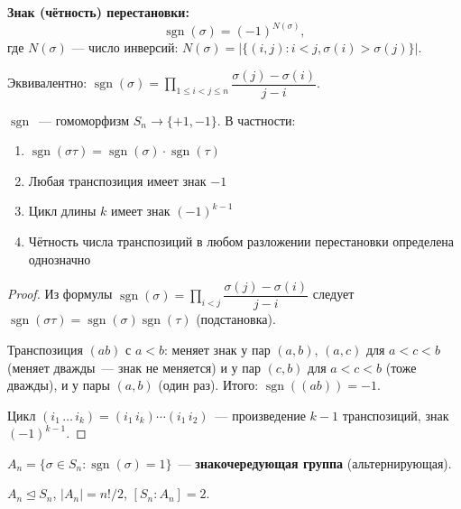 \documentclass[12pt]{article}
\begin{document}
	\begin{definition}
		\textbf{Знак (чётность) перестановки:}
		\[\operatorname{sgn}(\sigma) = (-1)^{N(\sigma)},\]
		где $N(\sigma)$ — число инверсий: $N(\sigma) = |\{(i,j) : i < j, \sigma(i) > \sigma(j)\}|$.
		
		Эквивалентно: $\operatorname{sgn}(\sigma) = \prod_{1 \leqslant i < j \leqslant n} \dfrac{\sigma(j) - \sigma(i)}{j - i}$.
	\end{definition}
	
	\begin{theorem}
		$\operatorname{sgn}$~--- гомоморфизм $S_n \to \{+1, -1\}$. В частности:
		\begin{enumerate}
			\item $\operatorname{sgn}(\sigma \tau) = \operatorname{sgn}(\sigma) \cdot \operatorname{sgn}(\tau)$
			\item Любая транспозиция имеет знак $-1$
			\item Цикл длины $k$ имеет знак $(-1)^{k-1}$
			\item Чётность числа транспозиций в любом разложении перестановки определена однозначно
		\end{enumerate}
	\end{theorem}
	
	\begin{proof}
		Из формулы $\operatorname{sgn}(\sigma) = \prod_{i < j} \dfrac{\sigma(j) - \sigma(i)}{j - i}$ следует $\operatorname{sgn}(\sigma\tau) = \operatorname{sgn}(\sigma)\operatorname{sgn}(\tau)$ (подстановка).
		
		Транспозиция $(ab)$ с $a < b$: меняет знак у пар $(a, b)$, $(a, c)$ для $a < c < b$ (меняет дважды~--- знак не меняется) и у пар $(c, b)$ для $a < c < b$ (тоже дважды), и у пары $(a, b)$ (один раз). Итого: $\operatorname{sgn}((ab)) = -1$.
		
		Цикл $(i_1 \, \dots \, i_k) = (i_1 \, i_k) \cdots (i_1 \, i_2)$~--- произведение $k - 1$ транспозиций, знак $(-1)^{k-1}$.
	\end{proof}
	
	\begin{definition}
		$A_n = \{\sigma \in S_n : \operatorname{sgn}(\sigma) = 1\}$~--- \textbf{знакочередующая группа} (альтернирующая).
	\end{definition}
	
	\begin{theorem}
		$A_n \trianglelefteq S_n$, $|A_n| = n!/2$, $[S_n : A_n] = 2$.
	\end{theorem}
	
\end{document}
